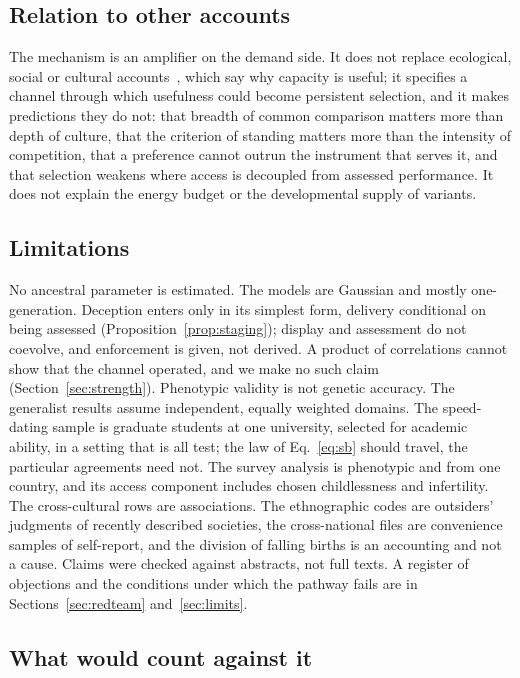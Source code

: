 \subsection{Relation to other accounts}

The mechanism is an amplifier on the demand side. It does not replace ecological, social or cultural
accounts~\cite{kaplan2000,gonzalezforero2018,dunbar1998,muthukrishna2018}, which say why capacity is useful; it specifies a
channel through which usefulness could become persistent selection, and it makes predictions they do not: that breadth of
common comparison matters more than depth of culture, that the criterion of standing matters more than the intensity of
competition, that a preference cannot outrun the instrument that serves it, and that selection weakens where access is
decoupled from assessed performance. It does not explain the energy budget or the developmental supply of variants.

\subsection{Limitations}

No ancestral parameter is estimated. The models are Gaussian and mostly one-generation. Deception enters only in its
simplest form, delivery conditional on being assessed (Proposition~\ref{prop:staging}); display and assessment do not
coevolve, and enforcement is given, not derived. A product of correlations cannot show that the channel operated, and we
make no such claim (Section~\ref{sec:strength}). Phenotypic validity is not genetic accuracy. The generalist results assume
independent, equally weighted domains. The speed-dating sample is graduate students at one university, selected for
academic ability, in a setting that is all test; the law of Eq.~\eqref{eq:sb} should travel, the particular agreements
need not. The survey analysis is phenotypic and from one country, and its access component includes chosen childlessness
and infertility. The cross-cultural rows are associations. The ethnographic codes are outsiders' judgments of recently described societies, the cross-national files are convenience samples of self-report, and the division of falling births is an accounting and not a cause. Claims were checked against abstracts, not full texts. A
register of \NObj{} objections and the conditions under which the pathway fails are in Sections~\ref{sec:redteam}
and~\ref{sec:limits}.

\subsection{What would count against it}

